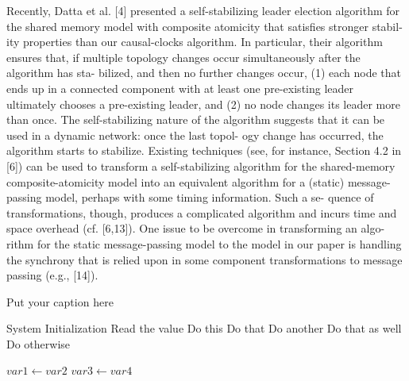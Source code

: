 Recently, Datta et al. [4] presented a self-stabilizing leader election algorithm
for the shared memory model with composite atomicity that satisfies stronger stabil-
ity properties than our causal-clocks algorithm. In particular, their algorithm ensures
that, if multiple topology changes occur simultaneously after the algorithm has sta-
bilized, and then no further changes occur, (1) each node that ends up in a connected
component with at least one pre-existing leader ultimately chooses a pre-existing
leader, and (2) no node changes its leader more than once. The self-stabilizing nature
of the algorithm suggests that it can be used in a dynamic network: once the last topol-
ogy change has occurred, the algorithm starts to stabilize. Existing techniques (see,
for instance, Section 4.2 in [6]) can be used to transform a self-stabilizing algorithm
for the shared-memory composite-atomicity model into an equivalent algorithm for
a (static) message-passing model, perhaps with some timing information. Such a se-
quence of transformations, though, produces a complicated algorithm and incurs time
and space overhead (cf. [6,13]). One issue to be overcome in transforming an algo-
rithm for the static message-passing model to the model in our paper is handling the
synchrony that is relied upon in some component transformations to message passing
(e.g., [14]).
\begin{algorithm}
\caption{Put your caption here}
\begin{algorithmic}[1]

    \State System Initialization
    \State Read the value 
        \State Do this
        \State Do that
        \State Do another
        \State Do that as well
        \Else
        \State Do otherwise
        \EndIf
    \EndIf

      
        \State $var1 \leftarrow var2$  
        \State $var3 \leftarrow var4$
    \EndWhile  \label{roy's loop}

\end{algorithmic}
\end{algorithm}
